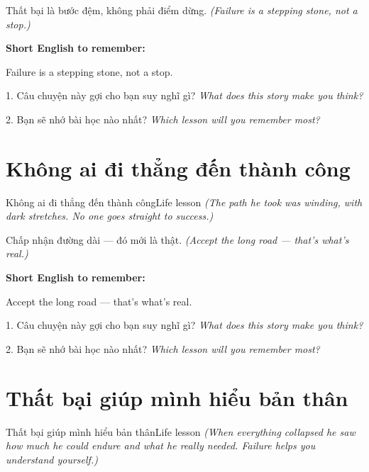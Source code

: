 \begin{baihoc}
Thất bại là bước đệm, không phải điểm dừng.
\textit{(Failure is a stepping stone, not a stop.)}
\end{baihoc}

\begin{ghinhoanh}
\textbf{Short English to remember:}

Failure is a stepping stone, not a stop.

\end{ghinhoanh}

\begin{tuhocnhanh}
1. Câu chuyện này gợi cho bạn suy nghĩ gì? \textit{What does this story make you think?}

2. Bạn sẽ nhớ bài học nào nhất? \textit{Which lesson will you remember most?}
\end{tuhocnhanh}
\ngancach


\section{Không ai đi thẳng đến thành công}
\begin{truyen}{Không ai đi thẳng đến thành công}{Life lesson}
\textit{(The path he took was winding, with dark stretches. No one goes straight to success.)}
\end{truyen}

\begin{baihoc}
Chấp nhận đường dài — đó mới là thật.
\textit{(Accept the long road — that's what's real.)}
\end{baihoc}

\begin{ghinhoanh}
\textbf{Short English to remember:}

Accept the long road — that's what's real.

\end{ghinhoanh}

\begin{tuhocnhanh}
1. Câu chuyện này gợi cho bạn suy nghĩ gì? \textit{What does this story make you think?}

2. Bạn sẽ nhớ bài học nào nhất? \textit{Which lesson will you remember most?}
\end{tuhocnhanh}
\ngancach


\section{Thất bại giúp mình hiểu bản thân}
\begin{truyen}{Thất bại giúp mình hiểu bản thân}{Life lesson}
\textit{(When everything collapsed he saw how much he could endure and what he really needed. Failure helps you understand yourself.)}
\end{truyen}


